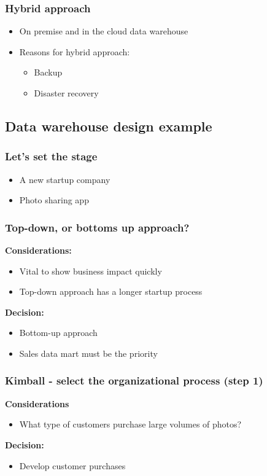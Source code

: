 \subsubsection{Hybrid approach}
\begin{itemize}
    \item On premise and in the cloud data warehouse
    \item Reasons for hybrid approach:
    \begin{itemize}
        \item Backup
        \item Disaster recovery
    \end{itemize}
\end{itemize}

\subsection{Data warehouse design example}
\subsubsection{Let's set the stage}
\begin{itemize}
    \item A new startup company
    \item Photo sharing app
\end{itemize}

\subsubsection{Top-down, or bottoms up approach?}
\textbf{Considerations:}
\begin{itemize}
    \item Vital to show business impact quickly
    \item Top-down approach has a longer startup process
\end{itemize}
\textbf{Decision:}
\begin{itemize}
    \item Bottom-up approach
    \item Sales data mart must be the priority
\end{itemize}

\subsubsection{Kimball - select the organizational process (step 1)}
\textbf{Considerations}
\begin{itemize}
    \item What type of customers purchase large volumes of photos?
\end{itemize}
\textbf{Decision:}
\begin{itemize}
    \item Develop customer purchases
\end{itemize}


